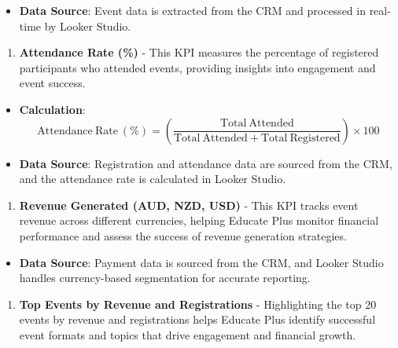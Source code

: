 \documentclass[11pt,a4paper,]{article}
\providecommand{\tightlist}{%
  \setlength{\itemsep}{0pt}\setlength{\parskip}{0pt}}
\begin{document}
\begin{itemize}
\tightlist
\item
  \textbf{Data Source}: Event data is extracted from the CRM and processed in real-time by Looker Studio.
\end{itemize}

\begin{enumerate}
\def\labelenumi{\arabic{enumi}.}
\setcounter{enumi}{8}
\tightlist
\item
  \textbf{Attendance Rate (\%)} - This KPI measures the percentage of registered participants who attended events, providing insights into engagement and event success.
\end{enumerate}

\begin{itemize}
\item
  \textbf{Calculation}:
  \[
  \mathrm{Attendance\ Rate\ (\%)} = \left(\textstyle \frac{\mathrm{Total\ Attended}}{\mathrm{Total\ Attended} + \mathrm{Total\ Registered}} \right) \times 100
  \]
\item
  \textbf{Data Source}: Registration and attendance data are sourced from the CRM, and the attendance rate is calculated in Looker Studio.
\end{itemize}

\begin{enumerate}
\def\labelenumi{\arabic{enumi}.}
\setcounter{enumi}{9}
\tightlist
\item
  \textbf{Revenue Generated (AUD, NZD, USD)} - This KPI tracks event revenue across different currencies, helping Educate Plus monitor financial performance and assess the success of revenue generation strategies.
\end{enumerate}

\begin{itemize}
\tightlist
\item
  \textbf{Data Source}: Payment data is sourced from the CRM, and Looker Studio handles currency-based segmentation for accurate reporting.
\end{itemize}

\begin{enumerate}
\def\labelenumi{\arabic{enumi}.}
\setcounter{enumi}{10}
\tightlist
\item
  \textbf{Top Events by Revenue and Registrations} - Highlighting the top 20 events by revenue and registrations helps Educate Plus identify successful event formats and topics that drive engagement and financial growth.
\end{enumerate}
\end{document}
